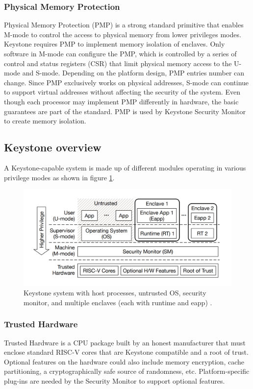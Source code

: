 \subsubsection{Physical Memory Protection}
Physical Memory Protection (PMP) is a strong standard primitive that enables M-mode to control the access to physical memory from lower privileges modes. Keystone requires PMP to implement memory isolation of enclaves.
Only software in M-mode can configure the PMP, which is controlled by a series of control and status registers (CSR) that limit physical memory access to the U-mode and S-mode. Depending on the platform design, PMP entries number can change. 
Since PMP exclusively works on physical addresses, S-mode can continue to support virtual addresses without affecting the security of the system. Even though each processor may implement PMP differently in hardware, the basic guarantees are part of the standard. PMP is used by Keystone Security Monitor to create memory isolation.

\subsection{Keystone overview}
A Keystone-capable system is made up of different modules operating in various privilege modes as shown in figure \ref{keystoneComponents}.

\begin{figure}[h!]
    \centering
    \includegraphics[scale=0.35]{./chapters/images/keystone-components.png}
    \caption{Keystone system with host processes, untrusted OS, security monitor, and multiple enclaves (each with runtime and eapp) \cite{lee2020keystone}.}
    \label{keystoneComponents}
\end{figure}
\subsubsection{Trusted Hardware}
Trusted Hardware is a CPU package built by an honest manufacturer that must enclose standard RISC-V cores that are Keystone compatible and a root of trust. Optional features on the hardware could also include memory encryption, cache partitioning, a cryptographically safe source of randomness, etc. Platform-specific plug-ins are needed by the Security Monitor to support optional features.
